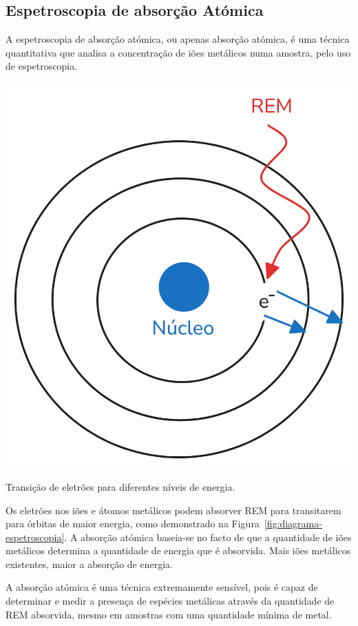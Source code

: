 \subsection*{Espetroscopia de absorção Atómica}\label{subsec:absorcao-atomica}

A espetroscopia de absorção atómica, ou apenas absorção atómica, é uma técnica quantitativa que analisa a concentração de iões metálicos numa amostra, pelo uso de espetroscopia.

\begin{marginfigure}
    \centering
    \includegraphics[width=0.8\linewidth]{figures/Diagrama - espetroscopia}
    \caption{Transição de eletrões para diferentes níveis de energia.}
    \label{fig:diagrama-espetroscopia}
\end{marginfigure}

Os eletrões nos iões e átomos metálicos podem absorver REM para transitarem para órbitas de maior energia, como demonstrado na Figura~\ref{fig:diagrama-espetroscopia}.
A absorção atómica baseia-se no facto de que a quantidade de iões metálicos determina a quantidade de energia que é absorvida.
Mais iões metálicos existentes, maior a absorção de energia.

A absorção atómica é uma técnica extremamente sensível, pois é capaz de determinar e medir a presença de espécies metálicas através da quantidade de REM absorvida, mesmo em amostras com uma quantidade mínima de metal.

